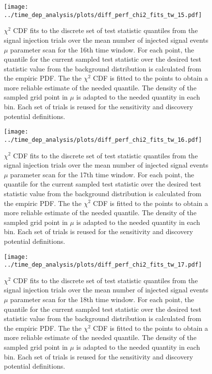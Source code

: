 \begin{figure}[H]
  \centering
  \texttt{[image: ../time\_dep\_analysis/plots/diff\_perf\_chi2\_fits\_tw\_15.pdf]}
  \caption[$\chi^2$ CDF fits for the 16th time window differential performance]{
     $\chi^2$ CDF fits to the discrete set of test statistic quantiles from the signal injection trials over the mean number of injected signal events $\mu$ parameter scan for the 16th time window.
     For each point, the quantile for the current sampled test statistic over the desired test statistic value from the background distribution is calculated from the empiric PDF.
     The the $\chi^2$ CDF is fitted to the points to obtain a more reliable estimate of the needed quantile.
     The density of the sampled grid point in $\mu$ is adapted to the needed quantity in each bin.
     Each set of trials is reused for the sensitivity and discovery potential definitions.
  }
  \label{fig:diff_perf_chi2_fits_tw_15}
\end{figure}
\begin{figure}[H]
  \centering
  \texttt{[image: ../time\_dep\_analysis/plots/diff\_perf\_chi2\_fits\_tw\_16.pdf]}
  \caption[$\chi^2$ CDF fits for the 17th time window differential performance]{
     $\chi^2$ CDF fits to the discrete set of test statistic quantiles from the signal injection trials over the mean number of injected signal events $\mu$ parameter scan for the 17th time window.
     For each point, the quantile for the current sampled test statistic over the desired test statistic value from the background distribution is calculated from the empiric PDF.
     The the $\chi^2$ CDF is fitted to the points to obtain a more reliable estimate of the needed quantile.
     The density of the sampled grid point in $\mu$ is adapted to the needed quantity in each bin.
     Each set of trials is reused for the sensitivity and discovery potential definitions.
  }
  \label{fig:diff_perf_chi2_fits_tw_16}
\end{figure}
\begin{figure}[H]
  \centering
  \texttt{[image: ../time\_dep\_analysis/plots/diff\_perf\_chi2\_fits\_tw\_17.pdf]}
  \caption[$\chi^2$ CDF fits for the 18th time window differential performance]{
     $\chi^2$ CDF fits to the discrete set of test statistic quantiles from the signal injection trials over the mean number of injected signal events $\mu$ parameter scan for the 18th time window.
     For each point, the quantile for the current sampled test statistic over the desired test statistic value from the background distribution is calculated from the empiric PDF.
     The the $\chi^2$ CDF is fitted to the points to obtain a more reliable estimate of the needed quantile.
     The density of the sampled grid point in $\mu$ is adapted to the needed quantity in each bin.
     Each set of trials is reused for the sensitivity and discovery potential definitions.
  }
  \label{fig:diff_perf_chi2_fits_tw_17}
\end{figure}

